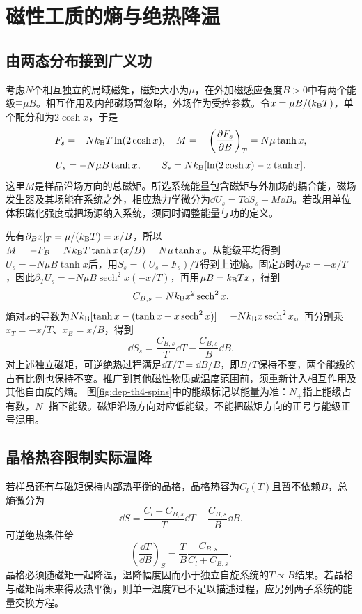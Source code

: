 \section{磁性工质的熵与绝热降温}
\subsection{由两态分布接到广义功}
考虑$N$个相互独立的局域磁矩，磁矩大小为$\mu$，在外加磁感应强度$B>0$中有两个能级$\mp\mu B$。相互作用及内部磁场暂忽略，外场作为受控参数。令$x=\mu B/(k_{\mathrm B} T)$，单个配分和为$2\cosh x$，于是
\[
 F_s=-Nk_{\mathrm B} T\ln(2\cosh x),\quad
 M=-\left(\frac{\partial F_s}{\partial B}\right)_T=N\mu\tanh x,
\]
\[
 U_s=-N\mu B\tanh x,\qquad
 S_s=Nk_{\mathrm B}[\ln(2\cosh x)-x\tanh x].
\]
这里$M$是样品沿场方向的总磁矩。所选系统能量包含磁矩与外加场的耦合能，磁场发生器及其场能在系统之外，相应热力学微分为$\dd U_s=T\dd S_s-M\dd B$。若改用单位体积磁化强度或把场源纳入系统，须同时调整能量与功的定义。

先有$\partial_Bx|_T=\mu/(k_{\mathrm B} T)=x/B$，所以$M=-F_B=Nk_{\mathrm B} T\tanh x\,(x/B)=N\mu\tanh x$。从能级平均得到$U_s=-N\mu B\tanh x$后，用$S_s=(U_s-F_s)/T$得到上述熵。固定$B$时$\partial_Tx=-x/T$，因此$\partial_TU_s=-N\mu B\operatorname{sech}^2x(-x/T)$，再用$\mu B=k_{\mathrm B} Tx$，得到
\[
 C_{B,s}=Nk_{\mathrm B} x^2\operatorname{sech}^2x.
\]
熵对$x$的导数为$Nk_{\mathrm B}[\tanh x-(\tanh x+x\operatorname{sech}^2x)]=-Nk_{\mathrm B} x\operatorname{sech}^2x$。再分别乘$x_T=-x/T$、$x_B=x/B$，得到
\[
 \dd S_s=\frac{C_{B,s}}T\dd T-\frac{C_{B,s}}B\dd B.
\]
对上述独立磁矩，可逆绝热过程满足$\dd T/T=\dd B/B$，即$B/T$保持不变，两个能级的占有比例也保持不变。推广到其他磁性物质或温度范围前，须重新计入相互作用及其他自由度的熵。
图\ref{fig:dep-th4-spins}中的能级标记以能量为准：$N_+$指上能级占有数，$N_-$指下能级。磁矩沿场方向对应低能级，不能把磁矩方向的正号与能级正号混用。

\subsection{晶格热容限制实际温降}
若样品还有与磁矩保持内部热平衡的晶格，晶格热容为$C_l(T)$且暂不依赖$B$，总熵微分为
\[
 \dd S=\frac{C_l+C_{B,s}}T\dd T-\frac{C_{B,s}}B\dd B.
\]
可逆绝热条件给
\[
 \left(\frac{\dd T}{\dd B}\right)_S
 =\frac TB\frac{C_{B,s}}{C_l+C_{B,s}}.
\]
晶格必须随磁矩一起降温，温降幅度因而小于独立自旋系统的$T\propto B$结果。若晶格与磁矩尚未来得及热平衡，则单一温度$T$已不足以描述过程，应另列两子系统的能量交换方程。


